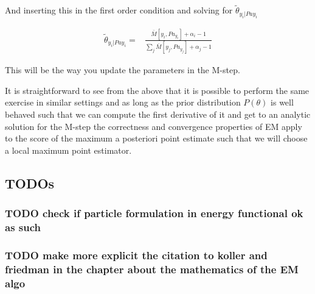 \documentclass[11pt]{article}
\begin{document}
And inserting this in the first order condition and solving for
\(\tilde{\theta}_{y_i | Pa{y_i}}\)

\begin{align} \label{eq:solution}
\tilde{\theta}_{y_i | Pa{y_i}} =& \frac{\bar{M}[y_i, Pa_{y_i}] + \alpha_i - 1}{\sum_j \bar{M}[y_j, Pa_{y_j}] + \alpha_j - 1}
\end{align}

This will be the way you update the parameters in the M-step.

It is straightforward to see from the above that it is possible to
perform the same exercise in similar settings and as long as the
prior distribution \(P(\theta)\) is well behaved such that we can
compute the first derivative of it and get to an analytic solution
for the M-step the correctness and convergence properties of EM
apply to the score of the maximum a posteriori point estimate such
that we will choose a local maximum point estimator.


\newpage





\subsection{TODOs}
\label{sec:orgfe0e29d}

\subsubsection{{\bfseries\sffamily TODO} check if particle formulation in energy functional ok as such}
\label{sec:orge914909}

\subsubsection{{\bfseries\sffamily TODO} make more explicit the citation to koller and friedman in the chapter about the mathematics of the EM algo}
\label{sec:org6de11a2}
\end{document}
